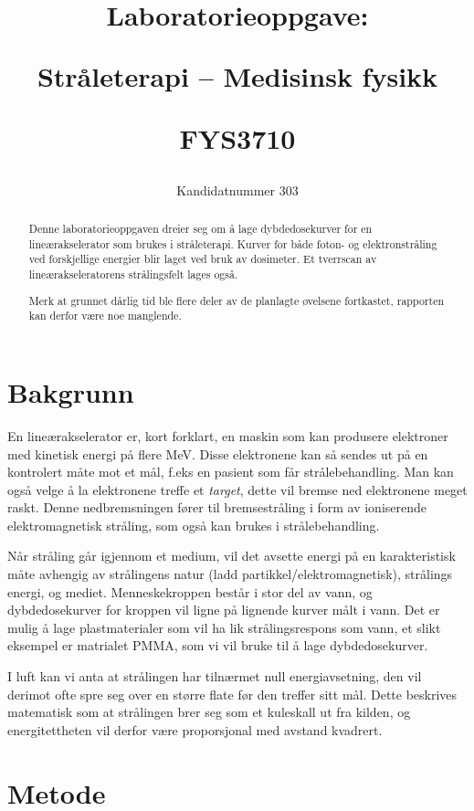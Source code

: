 \documentclass[a4paper, 11pt, notitlepage]{article}
\title{{\centerline{\Huge Laboratorieoppgave:}} \vspace{0.4cm} {\centerline{\Huge Stråleterapi – Medisinsk fysikk}} \vspace{0.4cm} {\centerline{\LARGE FYS3710}}}
\author{Kandidatnummer 303}
\begin{document}
\maketitle



\begin{abstract}
Denne laboratorieoppgaven dreier seg om å lage dybdedosekurver for en lineærakselerator som brukes i stråleterapi. Kurver for både foton- og elektronstråling ved forskjellige energier blir laget ved bruk av dosimeter. Et tverrscan av lineærakseleratorens strålingsfelt lages også.

Merk at grunnet dårlig tid ble flere deler av de planlagte øvelsene fortkastet, rapporten kan derfor være noe manglende.
\end{abstract}

\section{Bakgrunn}
En lineærakselerator er, kort forklart, en maskin som kan produsere elektroner med kinetisk energi på flere MeV. Disse elektronene kan så sendes ut på en kontrolert måte mot et mål, f.eks en pasient som får strålebehandling. Man kan også velge å la elektronene treffe et \emph{target}, dette vil bremse ned elektronene meget raskt. Denne nedbremsningen fører til bremsestråling i form av ioniserende elektromagnetisk stråling, som også kan brukes i strålebehandling.

Når stråling går igjennom et medium, vil det avsette energi på en karakteristisk måte avhengig av strålingens natur (ladd partikkel/elektromagnetisk), strålings energi, og mediet. Menneskekroppen består i stor del av vann, og dybdedosekurver for kroppen vil ligne på lignende kurver målt i vann. Det er mulig å lage plastmaterialer som vil ha lik strålingsrespons som vann, et slikt eksempel er matrialet PMMA, som vi vil bruke til å lage dybdedosekurver.

I luft kan vi anta at strålingen har tilnærmet null energiavsetning, den vil derimot ofte spre seg over en større flate før den treffer sitt mål. Dette beskrives matematisk som at strålingen brer seg som et kuleskall ut fra kilden, og energitettheten vil derfor være proporsjonal med avstand kvadrert.

\section{Metode}
\end{document}
